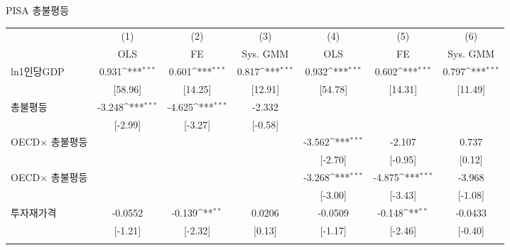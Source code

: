 \centering
\def\sym#1{\ifmmode^{#1}\else\(^{#1}\)\fi}
\caption{PISA 총불평등\label{tab:pisasimp}}
\begin{tabular}{l*{6}{c}}
\toprule
                    &\multicolumn{1}{c}{(1)}&\multicolumn{1}{c}{(2)}&\multicolumn{1}{c}{(3)}&\multicolumn{1}{c}{(4)}&\multicolumn{1}{c}{(5)}&\multicolumn{1}{c}{(6)}\\ &\multicolumn{1}{c}{OLS}&\multicolumn{1}{c}{FE}&\multicolumn{1}{c}{Sys. GMM}&\multicolumn{1}{c}{OLS}&\multicolumn{1}{c}{FE}&\multicolumn{1}{c}{Sys. GMM}\\
\midrule
ln1인당GDP        &       0.931\sym{***}&       0.601\sym{***}&       0.817\sym{***}&       0.932\sym{***}&       0.602\sym{***}&       0.797\sym{***}\\
                    &     [58.96]         &     [14.25]         &     [12.91]         &     [54.78]         &     [14.31]         &     [11.49]         \\
\addlinespace
총불평등          &      -3.248\sym{***}&      -4.625\sym{***}&      -2.332         &                     &                     &                     \\
                    &     [-2.99]         &     [-3.27]         &     [-0.58]         &                     &                     &                     \\
\addlinespace
OECD$ \times$ 총불평등&                     &                     &                     &      -3.562\sym{***}&      -2.107         &       0.737         \\
                    &                     &                     &                     &     [-2.70]         &     [-0.95]         &      [0.12]         \\
\addlinespace
OECD$ \times$ 총불평등&                     &                     &                     &      -3.268\sym{***}&      -4.875\sym{***}&      -3.968         \\
                    &                     &                     &                     &     [-3.00]         &     [-3.43]         &     [-1.08]         \\
\addlinespace
투자재가격        &     -0.0552         &      -0.139\sym{**} &      0.0206         &     -0.0509         &      -0.148\sym{**} &     -0.0433         \\
                    &     [-1.21]         &     [-2.32]         &      [0.13]         &     [-1.17]         &     [-2.46]         &     [-0.40]         \\
\addlinespace

\end{tabular}
